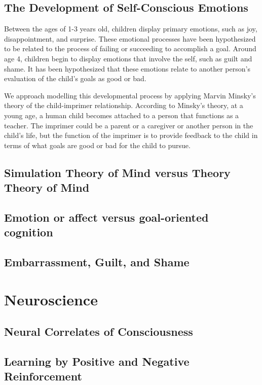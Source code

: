 \subsection{The Development of Self-Conscious Emotions}

Between the ages of 1-3 years old, children display primary emotions,
such as joy, disappointment, and surprise.  These emotional processes
have been hypothesized to be related to the process of failing or
succeeding to accomplish a goal.  Around age 4, children begin to
display emotions that involve the self, such as guilt and shame.  It
has been hypothesized that these emotions relate to another person's
evaluation of the child's goals as good or bad.

We approach modelling this developmental process by applying Marvin
Minsky's theory of the child-imprimer relationship.  According to
Minsky's theory, at a young age, a human child becomes attached to a
person that functions as a teacher.  The imprimer could be a parent or
a caregiver or another person in the child's life, but the function of
the imprimer is to provide feedback to the child in terms of what
goals are good or bad for the child to pursue.

\subsection{Simulation Theory of Mind versus Theory Theory of Mind}


\subsection{Emotion or affect versus goal-oriented cognition}


\subsection{Embarrassment, Guilt, and Shame}



\section{Neuroscience}

\subsection{Neural Correlates of Consciousness}

\subsection{Learning by Positive and Negative Reinforcement}











